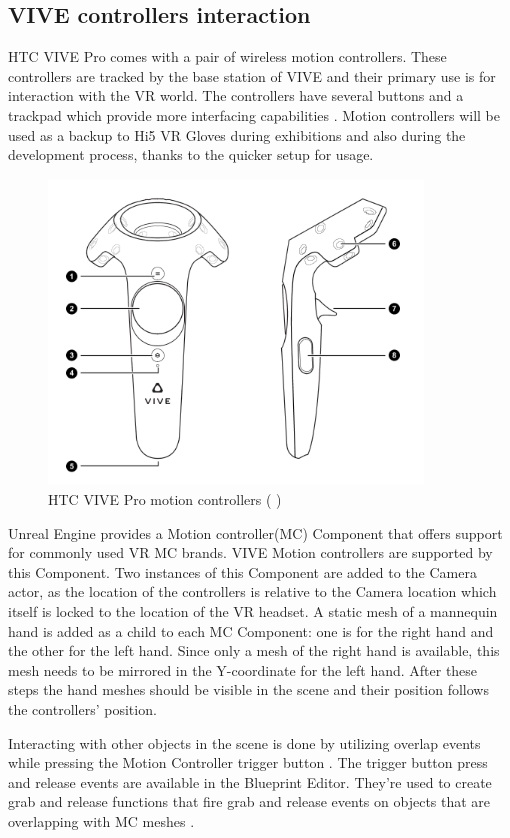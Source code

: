 \documentclass[12pt, a4paper,oneside, nocenter]{thesis}
\newcommand{\citeyeartitlexamkinline}[1]{(\usebibentry{#1}{title} \citeyear{#1})}
\begin{document}
\subsection{VIVE controllers interaction}
HTC VIVE Pro comes with a pair of wireless motion controllers. These controllers are tracked by the base station of VIVE and their primary use is for interaction with the VR world. The controllers have several buttons and a trackpad which provide more interfacing capabilities . Motion controllers will be used as a backup to Hi5 VR Gloves during exhibitions and also during the development process, thanks to the quicker setup for usage.
\begin{figure}[H]
	\includegraphics[height=230pt]{motion-controller}
	\caption{HTC VIVE Pro motion controllers \citeyeartitlexamkinline{vive-controllers-photo}}
	\label{fig:motion-controller}
\end{figure}
Unreal Engine provides a Motion controller(MC) Component that offers support for commonly used VR MC brands. VIVE Motion controllers are supported by this Component. Two instances of this Component are added to the Camera actor, as the location of the controllers is relative to the Camera location which itself is locked to the location of the VR headset. A static mesh of a mannequin hand is added as a child to each MC Component: one is for the right hand and the other for the left hand. Since only a mesh of the right hand is available, this mesh needs to be mirrored in the Y-coordinate for the left hand. After these steps the hand meshes should be visible in the scene and their position follows the controllers' position.
\par
Interacting with other objects in the scene is done by utilizing overlap events while pressing the Motion Controller trigger button . The trigger button press and release events are available in the Blueprint Editor. They're used to create grab and release functions that fire grab and release events on objects that are overlapping with MC meshes . 
\end{document}
